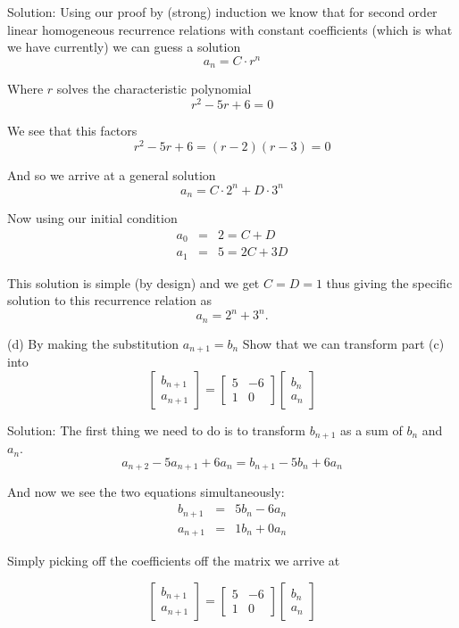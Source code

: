 \documentclass[16 pt]{amsart}
\theoremstyle{definition}
\theoremstyle{remark}
\numberwithin{equation}{subsection}
\begin{document}
\vspace{.5in}

Solution:  Using our proof by (strong) induction we know that for second order linear homogeneous recurrence relations with constant coefficients (which is what we have currently) we can guess a solution
\[
a_n = C\cdot r^n
\]

Where $r$ solves the characteristic polynomial
\[
r^2 - 5 r + 6 = 0
\]

We see that this factors
\[
r^2-5r+6 = (r-2)(r-3) = 0
\]

And so we arrive at a general solution
\[
a_n = C\cdot 2^n + D\cdot 3^n
\]

Now using our initial condition
\begin{eqnarray*}
a_0 &=& 2 = C+D\\
a_1 &=& 5 = 2C + 3D
\end{eqnarray*}

This solution is simple (by design) and we get $C=D=1$ thus giving the specific solution to this recurrence relation as
\[
a_n = 2^n + 3^n.
\]

\vspace{.5in}

(d) By making the substitution $a_{n+1}=b_n$ Show that we can transform part (c) into
\[
\begin{bmatrix}
b_{n+1} \\ a_{n+1}
\end{bmatrix} = \begin{bmatrix}
5 & -6 \\ 
1 & 0 
\end{bmatrix} \begin{bmatrix}
b_n \\ a_n
\end{bmatrix}
\]

\vspace{.5in}

Solution: The first thing we need to do is to transform $b_{n+1}$ as a sum of $b_n$ and $a_n$.
\[
a_{n+2} - 5 a_{n+1} + 6 a_n = b_{n+1} - 5 b_n +  6 a_n
\]

And now we see the two equations simultaneously:
\begin{eqnarray*}
b_{n+1} &=& 5 b_n - 6a_n\\
a_{n+1} &=& 1 b_n + 0 a_n 
\end{eqnarray*}

Simply picking off the coefficients off the matrix we arrive at

\[
\begin{bmatrix}
b_{n+1} \\ a_{n+1}
\end{bmatrix} = 
\begin{bmatrix}
5 & -6 \\ 1 & 0
\end{bmatrix}
\begin{bmatrix}
b_{n} \\ a_{n}
\end{bmatrix}
\]
\end{document}
